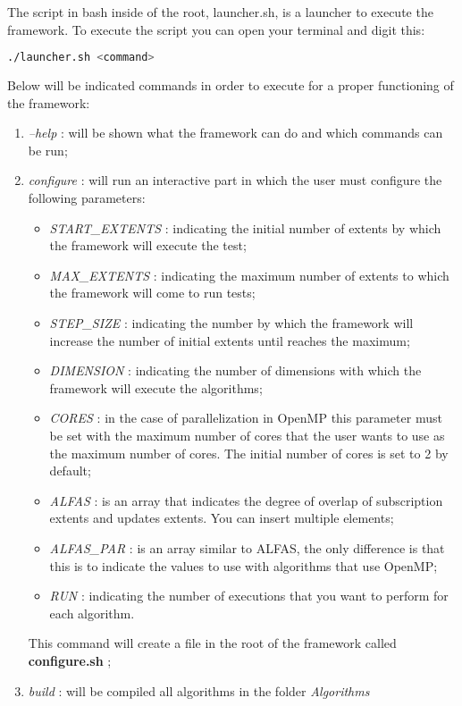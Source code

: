 \documentclass[a4paper,11pt]{report}
\newcommand{\folder}[1]{
  \textcolor{foldercolor}{\textit{#1}}
}
\newcommand{\command}[1]{
  \textcolor{commandcolor}{\textit{#1}}
}
\newcommand{\bashvariable}[1]{
  \textcolor{bashvariable}{\textit{#1}}
}
\newcommand{\bashfile}[1]{
  \textcolor{bashfilecolor}{\textbf{#1}}
}
\begin{document}
 The script in bash inside of the root, launcher.sh, is a launcher to execute the framework.
 To execute the script you can open your terminal and digit this:
 \begin{lstlisting}[language=bash]
  ./launcher.sh <command>
 \end{lstlisting}

 Below will be indicated commands in order to execute for a proper functioning of the framework:
 \begin{enumerate}
  \item \command{--help}: will be shown what the framework can do and which commands can be run;
  \item \command{configure}: will run an interactive part in which the user must configure the following 
  parameters:
  \begin{itemize}
   \item \bashvariable{START\_EXTENTS}: indicating the initial number of extents by which the 
   framework will execute the test;
   \item \bashvariable{MAX\_EXTENTS}: indicating the maximum number of extents to which the 
   framework will come to run tests;
   \item \bashvariable{STEP\_SIZE}: indicating the number by which the framework will increase 
   the number of initial extents until reaches the maximum;
   \item \bashvariable{DIMENSION}: indicating the number of dimensions with which the framework 
   will execute the algorithms;
   \item \bashvariable{CORES}: in the case of parallelization in OpenMP this parameter must 
   be set with the maximum number of cores that the user wants to use as the maximum number of cores. 
   The initial number of cores is set to 2 by default;
   \item \bashvariable{ALFAS}: is an array that indicates the degree of overlap of subscription extents 
   and updates extents. You can insert multiple elements;
   \item \bashvariable{ALFAS\_PAR}: is an array similar to ALFAS, the only difference is that 
   this is to indicate the values to use with algorithms that use OpenMP;
   \item \bashvariable{RUN}: indicating the number of executions that you want to perform for each algorithm.
  \end{itemize}
  This command will create a file in the root of the framework called \bashfile{configure.sh};
  \item \command{build}: will be compiled all algorithms in the folder \folder{Algorithms} 

\end{enumerate}
\end{document}
